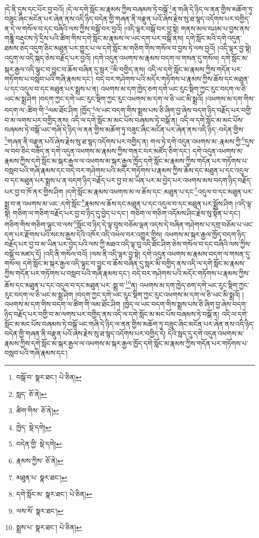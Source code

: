 །དེ་ནི་དུས་དང་པོར་བྱ་བའོ། །དེ་ལ་དགེ་སློང་མ་རྣམས་ཀྱིས་བཞམས་ཏེ་བསྒོ་\footnote{བསྒོ་བ་  སྣར་ཐང་།  པེ་ཅིན། }ན་གཞི་དེ་ཉིད་ལ་ནན་གྱིས་མཆོག་ཏུ་བཟུང་ཞིང་མངོན་པར་ཞེན་ནས་འདི་ཉིད་བདེན་གྱི་གཞན་ནི་བརྫུན་པའོ་ཞེས་རྗེས་སུ་ཐ་སྙད་འདོགས་པར་བགྱིད་ན་དེ་ལ་གསོལ་བ་དང་བཞིའི་ལས་ཀྱིས་བསྒོ་བར་བྱའོ། །འདི་ལྟར་བསྒོ་བར་བྱ་སྟེ། གནས་མལ་བཤམ་པ་བྱས་ནས་གཎྜཱི་བརྡུངས་ཏེ་དྲིས་པའི་ཚིག་གིས་དགེ་སློང་མ་རྣམས་ལ་ཡང་དག་པར་བསྒོ་ནས། དགེ་སློང་མའི་དགེ་འདུན་ཐམས་ཅད་འདུག་ཅིང་མཐུན་པར་གྱུར་པ་ལ་དགེ་སློང་མ་གཅིག་གིས་གསོལ་བ་བྱས་ཏེ་ལས་བྱའོ། །འདི་ལྟར་བྱ་སྟེ། འདུག་ལ་འདི་སྐད་ཅེས་བརྗོད་པར་བྱའོ། །དགེ་འདུན་འཕགས་མ་རྣམས་བདག་ལ་གསན་དུ་གསོལ། དགེ་སློང་མ་སྐར་རྒྱལ་འདི་ལྟུང་བ་བྱུང་བ་ཆོས་བཞིན་དུ་སླར་\footnote{སླད་  ཅོ་ནེ། }མི་བགྱིད་ནས། འདི་ལ་དགེ་སློང་མ་རྣམས་ཀྱིས་གདོན་པར་གཏོགས་པ་བསླབ་པའི་གཞི་རྣམས་དང་། བདེ་བར་གཤེགས་པའི་མདོར་གཏོགས་པ་རྣམས་ཀྱིས་ཆོས་དང་མཐུན་པ་དང་འདུལ་བ་དང་མཐུན་པར་སྨྲས་པ་ན། འཕགས་མ་དག་ཁྱེད་ཅག་དགེ་ཡང་རུང་སྡིག་ཀྱང་རུང་བདག་ལ་ཅི་ཡང་མ་སྨྲ་ཤིག །བདག་ཀྱང་དགེ་ཡང་རུང་སྡིག་ཀྱང་རུང་འཕགས་མ་དག་ལ་ཅི་ཡང་མི་སྨྲའོ། །འཕགས་མ་དག་གིས་བདག་ལ་:ཚིག་གི་\footnote{ཚིག་གིས་  ཅོ་ནེ། }ལམ་ཐོང་ཤིག །ཁྱོད་\footnote{ཁྱེད་  སྡེ་དགེ། }ལ་ཡང་བདག་གིས་སྨྲས་པས་ཅི་ཞིག་བྱ་ཞེས་བདག་ཉིད་བརྗོད་པར་བགྱི་བ་མ་ལགས་པར་བགྱིད་ནས། འདི་ལ་དགེ་སློང་མ་མང་པོས་བཞམས་ཏེ་བསྒོ་ན། འདི་ལ་དགེ་སློང་མ་མང་པོས་བཞམས་ཏེ་བསྒོ་ཡང་གཞི་དེ་ཉིད་ལ་ནན་གྱིས་མཆོག་ཏུ་བཟུང་ཞིང་མངོན་པར་ཞེན་ནས་འདི་ཉིད་:བདེན་གྱིས་\footnote{བདེན་གྱི་  སྡེ་དགེ། }གཞན་ནི་བརྫུན་པའོ་ཞེས་རྗེས་སུ་ཐ་སྙད་འདོགས་པར་བགྱིད་ན། གལ་ཏེ་དགེ་འདུན་འཕགས་མ་:རྣམས་ཀྱི་\footnote{རྣམས་ཀྱིས་  ཅོ་ནེ། }དུས་ལ་བབ་ཅིང་བཟོད་ན་དགེ་འདུན་འཕགས་མ་རྣམས་ཀྱིས་གནང་བར་མཛོད་ཅིག་དང་། དགེ་འདུན་འཕགས་མ་རྣམས་ཀྱིས་དགེ་སློང་མ་སྐར་རྒྱལ་ལ་འཕགས་མ་སྐར་རྒྱལ་ཁྱོད་དགེ་སློང་མ་རྣམས་ཀྱིས་གདོན་པར་གཏོགས་པ་བསླབ་པའི་གཞི་རྣམས་དང་བདེ་བར་གཤེགས་པའི་མདོར་གཏོགས་པ་རྣམས་ཀྱིས་ཆོས་དང་མཐུན་པ་དང་འདུལ་བ་དང་མཐུན་པར་སྨྲས་པ་ན་བདག་ཉིད་བརྗོད་པར་བྱ་བ་མ་ཡིན་པར་མ་བྱེད་པར་འཕགས་མས་བདག་ཉིད་བརྗོད་པར་བྱ་བ་ཁོ་ནར་གྱིས་ཤིག །དགེ་སློང་མ་རྣམས་འཕགས་མ་ལ་ཆོས་དང་:མཐུན་པ་དང་\footnote{མཐུན་པ་  སྣར་ཐང་། }འདུལ་བ་དང་མཐུན་པར་སྨྲ་བ་ན་འཕགས་མ་ཡང་:དགེ་སློང་\footnote{དགེ་སློང་མ་  སྣར་ཐང་།  པེ་ཅིན། }རྣམས་ལ་ཆོས་དང་མཐུན་པ་དང་འདུལ་བ་དང་མཐུན་པར་སྨྲོས་ཤིག །འདི་ལྟ་སྟེ། གཅིག་ལ་གཅིག་བརྗོད་པར་བྱ་བ་ཉིད་དུ་བྱེད་པ་དང་། གཅིག་ལ་གཅིག་འདོམས་ཤིང་རྗེས་སུ་སྟོན་པ་དང་། གཅིག་གིས་གཅིག་ལྟུང་བ་ལས་\footnote{ལས་སོ་  སྣར་ཐང་། }སློང་བ་ཉིད་དེ་ལྟ་བུས་བཅོམ་ལྡན་འདས་དེ་བཞིན་གཤེགས་པ་དགྲ་བཅོམ་པ་ཡང་དག་པར་རྫོགས་པའི་སངས་རྒྱས་དེའི་འཁོར་འདི་འཕེལ་བར་འགྱུར་གྱིས། འཕགས་མ་སྐར་རྒྱལ་ཁྱོད་བདག་ཉིད་བརྗོད་པར་བྱ་བ་མ་ཡིན་པར་བྱེད་པའི་ལས་ཀྱི་མཐའ་འདི་ལྟ་བུ་འདི་ཐོང་ཤིག་ཅེས་གསོལ་བ་དང་བཞིའི་ལས་ཀྱིས་བསྒོ་བ་མཛད་དོ། །འདི་ནི་གསོལ་བའོ། །ལས་ནི་འདི་ལྟར་བྱ་སྟེ། དགེ་འདུན་འཕགས་མ་རྣམས་བདག་ལ་གསན་དུ་གསོལ། དགེ་སློང་མ་སྐར་རྒྱལ་འདི་ལྟུང་བ་བྱུང་བ་ཆོས་བཞིན་དུ་སླར་མི་བགྱིད་ནས་འདི་ལ་དགེ་སློང་མ་རྣམས་ཀྱིས་གདོན་པར་གཏོགས་པ་བསླབ་པའི་གཞི་རྣམས་དང་། བདེ་བར་གཤེགས་པའི་མདོར་གཏོགས་པ་རྣམས་ཀྱིས་ཆོས་དང་མཐུན་པ་དང་འདུལ་བ་དང་མཐུན་པར་:སྨྲ་བ་\footnote{སྨྲས་པ་  སྣར་ཐང་།  པེ་ཅིན། }ན། འཕགས་མ་དག་ཁྱེད་ཅག་དགེ་ཡང་རུང་སྡིག་ཀྱང་རུང་བདག་ལ་ཅི་ཡང་མ་སྨྲ་ཤིག །བདག་ཀྱང་དགེ་ཡང་རུང་སྡིག་ཀྱང་རུང་འཕགས་མ་དག་ལ་ཅི་ཡང་མི་སྨྲའོ། །འཕགས་མ་དག་གིས་བདག་ལ་ཚིག་གི་ལམ་ཐོང་ཤིག །ཁྱེད་ལ་ཡང་བདག་གིས་སྨྲས་པས་ཅི་ཞིག་བྱ་ཞེས་བདག་ཉིད་བརྗོད་པར་བགྱི་བ་མ་ལགས་པར་བགྱིད་ནས་འདི་ལ་དགེ་སློང་མ་མང་པོས་བཞམས་ཏེ་བསྒོ་ན། འདི་ལ་དགེ་སློང་མ་མང་པོས་བཞམས་ཏེ་བསྒོ་ཡང་གཞི་དེ་ཉིད་ལ་ནན་གྱིས་མཆོག་ཏུ་བཟུང་ཞིང་མངོན་པར་ཞེན་ནས་འདི་ཉིད་བདེན་གྱི་གཞན་ནི་བརྫུན་པའོ་ཞེས་རྗེས་སུ་ཐ་སྙད་འདོགས་པར་བགྱིད་དེ། དེའི་སླད་དུ་དགེ་འདུན་འཕགས་མ་རྣམས་ཀྱིས་དགེ་སློང་མ་སྐར་རྒྱལ་ལ་འཕགས་མ་སྐར་རྒྱལ་ཁྱོད་དགེ་སློང་མ་རྣམས་ཀྱིས་གདོན་པར་གཏོགས་པ་བསླབ་པའི་གཞི་རྣམས་དང་། 